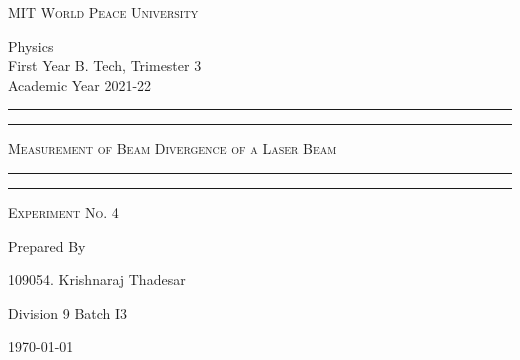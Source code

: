\documentclass[11pt]{article}
\begin{document}
	
	\begin{titlepage} 
		\centering 
		
		
		\huge\textsc{
			MIT World Peace University
		}\\
	
		\vspace{0.75\baselineskip} %
		
		\LARGE{
			Physics\\
			First Year B. Tech, Trimester 3\\
			Academic Year 2021-22
		}
		
		\vfill %
		
		
		\rule{\textwidth}{1.6pt}\vspace*{-\baselineskip}\vspace*{2pt}
		\rule{\textwidth}{0.6pt}
		\vspace{0.75\baselineskip} %
		
		
		
		\huge{\textsc{
				Measurement of Beam Divergence of a Laser Beam
			}} \\
		
		
		
		\vspace{0.5\baselineskip} %
		\rule{\textwidth}{0.6pt}\vspace*{-\baselineskip}\vspace*{2.8pt}
		\rule{\textwidth}{1.6pt}
		
		\vspace{1\baselineskip} %

			
		\LARGE\textsc{
			Experiment No. 4
		} %
		\vfill
		
		
		Prepared By
		\vspace{0.5\baselineskip} %
		
		\Large{
			109054. Krishnaraj Thadesar
			
			Division 9 Batch I3
		}
		
		
		\vspace{0.5\baselineskip} %
		\today

	\end{titlepage}
\end{document}
